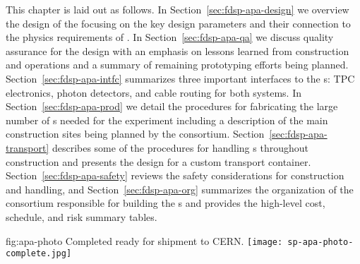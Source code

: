 This chapter is laid out as follows.  In Section~\ref{sec:fdsp-apa-design} we overview the design of the  focusing on the key design parameters and their connection to the physics requirements of .  In Section~\ref{sec:fdsp-apa-qa} we discuss quality assurance for the design with an emphasis on lessons learned from  construction and operations and a summary of remaining prototyping efforts being planned. Section~\ref{sec:fdsp-apa-intfc} summarizes three important interfaces to the s: TPC electronics, photon detectors, and cable routing for both systems.  In Section~\ref{sec:fdsp-apa-prod} we detail the procedures for fabricating the large number of s needed for the experiment including a description of the main construction sites being planned by the  consortium.  Section~\ref{sec:fdsp-apa-transport} describes some of the procedures for handling s throughout construction and presents the design for a custom transport container. Section~\ref{sec:fdsp-apa-safety} reviews the safety considerations for  construction and handling, and Section~\ref{sec:fdsp-apa-org} summarizes the organization of the  consortium responsible for building the s and provides the high-level cost, schedule, and risk summary tables. 

\begin{dunefigure}{fig:apa-photo}
{Completed   ready for shipment to CERN.}
\texttt{[image: sp-apa-photo-complete.jpg]}
\end{dunefigure}
